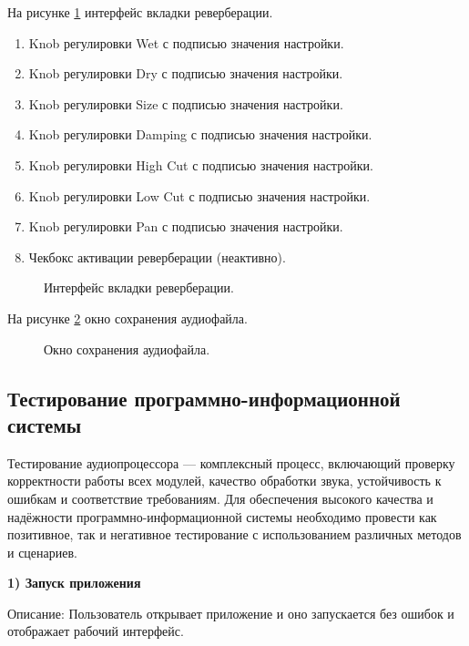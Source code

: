 На рисунке \ref{ReverbWind:image} интерфейс вкладки реверберации.

\begin{enumerate}
	\item Knob регулировки Wet с подписью значения настройки.
	\item Knob регулировки Dry с подписью значения настройки.
	\item Knob регулировки Size с подписью значения настройки.
	\item Knob регулировки Damping с подписью значения настройки.
	\item Knob регулировки High Cut с подписью значения настройки.
	\item Knob регулировки Low Cut с подписью значения настройки.
	\item Knob регулировки Pan с подписью значения настройки.
	\item Чекбокс активации реверберации (неактивно).
\end{enumerate}

\begin{figure}[ht]
	\caption{Интерфейс вкладки реверберации.}
	\label{ReverbWind:image}
\end{figure}

На рисунке \ref{SaveWind:image} окно сохранения аудиофайла.

\begin{figure}[ht]
	\caption{Окно сохранения аудиофайла.}
	\label{SaveWind:image}
\end{figure}

\subsection{Тестирование программно-информационной системы}

Тестирование аудиопроцессора — комплексный процесс, включающий проверку корректности работы всех модулей, качество обработки звука, устойчивость к ошибкам и соответствие требованиям. Для обеспечения высокого качества и надёжности программно-информационной системы необходимо провести как позитивное, так и негативное тестирование с использованием различных методов и сценариев.

\clearpage
\textbf{1) Запуск приложения}

Описание: Пользователь открывает приложение и оно запускается без ошибок и отображает рабочий интерфейс.

